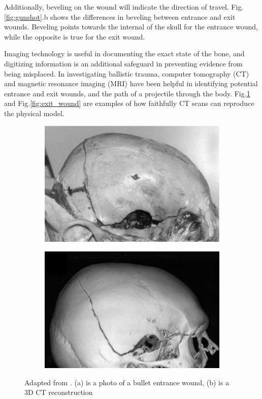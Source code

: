 \documentclass[titlepage]{article}
\begin{document}
Additionally, beveling on the wound will indicate the direction of travel. Fig.\ref{fig:gunshot}.b shows the differences in beveling between entrance and exit wounds. Beveling points towards the internal of the skull for the entrance wound, while the opposite is true for the exit wound.\cite{ballistic-trauma}

Imaging technology is useful in documenting the exact state of the bone, and digitizing information is an additional safeguard in preventing evidence from being misplaced. In investigating ballistic trauma, computer tomography (CT) and magnetic resonance imaging (MRI) have been helpful in identifying potential entrance and exit wounds, and the path of a projectile through the body. Fig.\ref{fig:entrance_wound} and Fig.\ref{fig:exit_wound} are examples of how faithfully CT scans can reproduce the physical model.

\begin{figure}[h!]
\centering
\begin{subfigure}{.5\textwidth}
  \centering
  \includegraphics[width=.7\linewidth]{entrance}
  \caption{}
  \end{subfigure}%
\begin{subfigure}{.5\textwidth}
  \centering
  \includegraphics[width=.7\linewidth]{entrance_ct}
  \caption{}
\end{subfigure}
\caption{Adapted from \cite{post-imaging}. (a) is a photo of a bullet entrance wound, (b) is a 3D CT reconstruction}
\label{fig:entrance_wound}
\end{figure}
\end{document}
